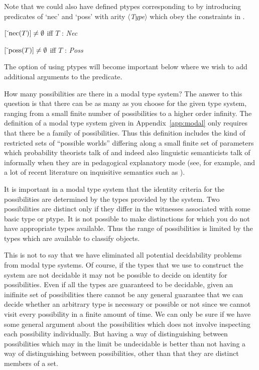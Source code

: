 Note that we could also have defined ptypes corresponding to \preveg{}
by introducing predicates of `nec' and `poss' with arity
$\langle$\textit{Type}$\rangle$ which obey the constraints in
\nexteg{}.
\begin{ex} 
\begin{subex} 
 
\item $[\ \!\check{}\ \!\text{nec}(T)] \not=\emptyset$ iff $T$ : \textit{Nec} 
 
\item $[\ \!\check{}\ \!\text{poss}(T)] \not=\emptyset$ iff $T$ : \textit{Poss} 
 
\end{subex} 
   
\end{ex} 
The option of using ptypes will become important below where we wish
to add additional arguments to the predicate.   
   
How many possibilities are there in a modal type system?  The answer
to this question is that there can be as many as you choose for the
given type system, ranging from a small finite number of possibilities
to a higher order infinity.  The definition of a modal type system
given in Appendix~\ref{app:modal} only requires that there be a family
of possibilities.  Thus this definition includes the kind of
restricted sets of ``possible worlds'' differing along a small finite
set of parameters which probability theorists talk of and indeed also
linguistic semanticists talk of informally when they are in pedagogical
explanatory mode (see, for example, \citealp{DowtyWallPeters1981} and
a lot of recent literature on inquisitive semantics such as
\citealp{GroenendijkRoelofsen2012}).  

It is important in a modal type system that the identity criteria for
the possibilities are determined by the types provided by the system.
Two possibilities are distinct only if they differ in the witnesses
associated with some basic type or ptype.  It is not possible to make
distinctions for which you do not have appropriate types available.
Thus the range of possibilities is limited by the types which are
available to classify objects.

This is not to say that we have eliminated all potential decidability
problems from modal type systems.  Of course, if the types that we use
to construct the system are not decidable it may not be possible to
decide on identity for possibilities.  Even if all the types are
guaranteed to be decidable, given an inifinite
set of possibilities there cannot be any general guarantee that we can
decide whether an arbitrary type is necessary or possible or not since
we cannot visit every possibility in a finite amount of time.  We can
only be sure if we have some general argument about the
possibilities which does not involve inspecting each possibility
individually.  But having a way of distinguishing between
possibilities which may in the limit be undecidable is better than not
having a way of distinguishing between possibilities, other than that
they are distinct members of a set.

